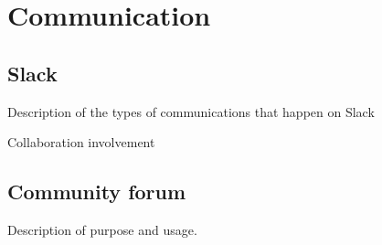 \section{Communication}

\subsection{Slack}

Description of the types of communications that happen on Slack

Collaboration involvement



\subsection{Community forum}

Description of purpose and usage.



